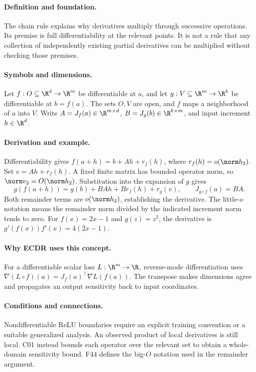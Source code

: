 \paragraph{Definition and foundation.}
The chain rule explains why derivatives multiply through successive operations. Its premise is full differentiability at the relevant points. It is not a rule that any collection of independently existing partial derivatives can be multiplied without checking those premises.
\paragraph{Symbols and dimensions.}
Let $f:O\subseteq\R^d\to\R^m$ be differentiable at $a$, and let $g:V\subseteq\R^m\to\R^k$ be differentiable at $b=f(a)$. The sets $O,V$ are open, and $f$ maps a neighborhood of $a$ into $V$. Write $A=J_f(a)\in\R^{m\times d}$, $B=J_g(b)\in\R^{k\times m}$, and input increment $h\in\R^d$.
\paragraph{Derivation and example.}
Differentiability gives $f(a+h)=b+Ah+r_f(h)$, where $r_f(h)=o(\norm h_2)$. Set $v=Ah+r_f(h)$. A fixed finite matrix has bounded operator norm, so $\norm v_2=O(\norm h_2)$. Substitution into the expansion of $g$ gives
\[
 g(f(a+h))=g(b)+BAh+B r_f(h)+r_g(v),
 \qquad J_{g\circ f}(a)=BA.
\]
Both remainder terms are $o(\norm h_2)$, establishing the derivative. The little-$o$ notation means the remainder norm divided by the indicated increment norm tends to zero. For $f(x)=2x-1$ and $g(z)=z^2$, the derivative is $g'(f(x))f'(x)=4(2x-1)$.
\paragraph{Why ECDR uses this concept.}
For a differentiable scalar loss $L:\R^m\to\R$, reverse-mode differentiation uses $\nabla(L\circ f)(a)=J_f(a)^\top\nabla L(f(a))$. The transpose makes dimensions agree and propagates an output sensitivity back to input coordinates.
\paragraph{Conditions and connections.}
Nondifferentiable ReLU boundaries require an explicit training convention or a suitable generalized analysis. An observed product of local derivatives is still local. C01 instead bounds each operator over the relevant set to obtain a whole-domain sensitivity bound. F44 defines the big-$O$ notation used in the remainder argument.

